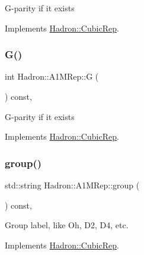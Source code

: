 G-\/parity if it exists 

Implements \mbox{\hyperlink{structHadron_1_1CubicRep_a52104e43266d1614c00bbd1c3b395458}{Hadron\+::\+Cubic\+Rep}}.

\mbox{\label{structHadron_1_1A1MRep_ab4115cbdcbc20fdc0641d1dc82da3f2f}} 
\subsubsection{\texorpdfstring{G()}{G()}\hspace{0.1cm}{\footnotesize\ttfamily [3/3]}}
{\footnotesize\ttfamily int Hadron\+::\+A1\+M\+Rep\+::G (\begin{DoxyParamCaption}{ }\end{DoxyParamCaption}) const\hspace{0.3cm}{\ttfamily [inline]}, {\ttfamily [virtual]}}

G-\/parity if it exists 

Implements \mbox{\hyperlink{structHadron_1_1CubicRep_a52104e43266d1614c00bbd1c3b395458}{Hadron\+::\+Cubic\+Rep}}.

\mbox{\label{structHadron_1_1A1MRep_ad0776ade0fd54254ee8d0e3ba00b1f33}} 
\subsubsection{\texorpdfstring{group()}{group()}\hspace{0.1cm}{\footnotesize\ttfamily [1/3]}}
{\footnotesize\ttfamily std\+::string Hadron\+::\+A1\+M\+Rep\+::group (\begin{DoxyParamCaption}{ }\end{DoxyParamCaption}) const\hspace{0.3cm}{\ttfamily [inline]}, {\ttfamily [virtual]}}

Group label, like Oh, D2, D4, etc. 

Implements \mbox{\hyperlink{structHadron_1_1CubicRep_a0748f11ec87f387062c8e8981339a29c}{Hadron\+::\+Cubic\+Rep}}.

\mbox{\label{structHadron_1_1A1MRep_ad0776ade0fd54254ee8d0e3ba00b1f33}} 
